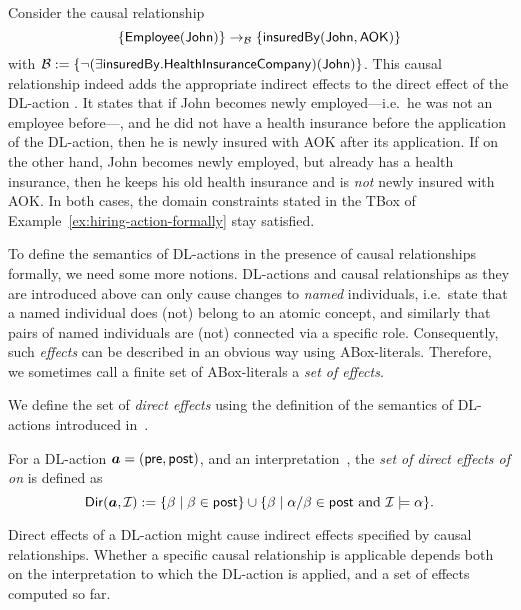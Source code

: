 \begin{example}\label{ex:hiring-action-cr}
    Consider the causal relationship
    \[\causes{\{\Employee(\John)\}}%
        {\{\insBy(\John,\AOK)\}}%
        {\Bmc}\]
    with $\mathcal{B}:=\{\lnot(\exists\mathsf{insuredBy}.\mathsf{HealthInsuranceCompany})(\mathsf{John})\}$.  This causal
    relationship indeed adds the appropriate indirect effects to the direct
    effect of the DL-action \HireJohn.  It states that if John becomes newly
    employed---i.e.~he was not an employee before---, and he did not have a
    health insurance before the application of the DL-action, then he is newly
    insured with AOK after its application.  If on the other hand, John becomes
    newly employed, but already has a health insurance, then he keeps his old
    health insurance and is \emph{not} newly insured with AOK\@.  In both cases,
    the domain constraints stated in the TBox \Tmc of
    Example~\ref{ex:hiring-action-formally} stay satisfied.
\end{example}

\noindent
To define the semantics of DL-actions in the presence of causal relationships
formally, we need some more notions.
%
DL-actions and causal relationships as they are introduced above can only cause
changes to \emph{named} individuals, i.e.~state that a named individual does
(not) belong to an atomic concept, and similarly that pairs of named individuals
are (not) connected via a specific role.  Consequently, such \emph{effects} can
be described in an obvious way using ABox-literals.  Therefore, we sometimes
call a finite set of ABox-literals a \emph{set of effects}.

We define the set of \emph{direct effects} using the definition of the semantics
of DL-actions introduced in~\cite{BLM+-AAAI05}.

\begin{definition}\label{def:direct-effects}
    For a DL-action $\boldsymbol a=(\mathsf{pre},\mathsf{post})$, and an interpretation~\Imc,
    the \emph{set of direct effects of \abf on \Imc} is defined as
    \[\Dir(\abf,\Imc):=\{\beta\mid\beta\in\post\}\cup%
        \{\beta\mid\alpha/\beta\in\post\text{ and }\Imc\models\alpha\}.\]
\end{definition}

\noindent
Direct effects of a DL-action might cause indirect effects specified by causal
relationships.  Whether a specific causal relationship is applicable depends
both on the interpretation to which the DL-action is applied, and a set of
effects computed so far.

